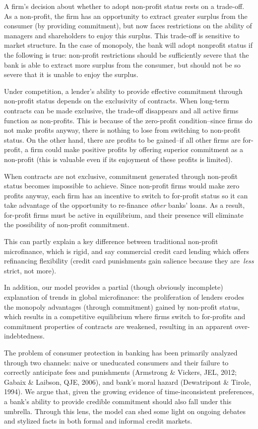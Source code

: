 \documentclass[11pt]{article}%
\begin{document}
A firm's decision about whether to adopt non-profit status rests on a
trade-off. As a non-profit, the firm has an opportunity to extract greater
surplus from the consumer (by providing commitment), but now faces
restrictions on the ability of managers and shareholders to enjoy this
surplus. This trade-off is sensitive to market structure. In the case of
monopoly, the bank will adopt nonprofit status if the following is true:
non-profit restrictions should be sufficiently severe that the bank is able to
extract more surplus from the consumer, but should not be so severe that it is
unable to enjoy the surplus.

Under competition, a lender's ability to provide effective commitment through
non-profit status depends on the exclusivity of contracts. When long-term
contracts can be made exclusive, the trade-off disappears and all active firms
function as non-profits. This is because of the zero-profit condition--since
firms do not make profits anyway, there is nothing to lose from switching to
non-profit status. On the other hand, there are profits to be gained--if all
other firms are for-profit, a firm could make positive profits by offering
superior commitment as a non-profit (this is valuable even if its enjoyment of
these profits is limited).

When contracts are not exclusive, commitment generated through non-profit
status becomes impossible to achieve. Since non-profit firms would make zero
profits anyway, each firm has an incentive to switch to for-profit status so
it can take advantage of the opportunity to re-finance \textit{other} banks'
loans. As a result, for-profit firms must be active in equilibrium, and their
presence will eliminate the possibility of non-profit commitment.

This can partly explain a key difference between traditional non-profit
microfinance, which is rigid, and say commercial credit card lending which
offers refinancing flexibility (credit card punishments gain salience because
they are\textit{\ less} strict, not more).

In addition, our model provides a partial (though obviously incomplete)
explanation of trends in global microfinance: the proliferation of lenders
erodes the monopoly advantages (through commitment) gained by non-profit
status, which results in a competitive equilibrium where firms switch to
for-profits and commitment properties of contracts are weakened, resulting in
an apparent over-indebtedness.

The problem of consumer protection in banking has been primarily analyzed
through two channels: naive or uneducated consumers and their failure to
correctly anticipate fees and punishments (Armstrong \& Vickers, JEL, 2012;
Gabaix \& Laibson, QJE, 2006), and bank's moral hazard (Dewatripont \& Tirole,
1994). We argue that, given the growing evidence of time-inconsistent
preferences, a bank's ability to provide credible commitment should also fall
under this umbrella. Through this lens, the model can shed some light on
ongoing debates and stylized facts in both formal and informal credit markets.
\end{document}
